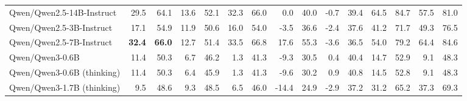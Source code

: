 \documentclass{article}
\begin{document}
\begin{table}[htbp]
\begin{threeparttable}
\begin{adjustbox}{max width=\textwidth}
\begin{tabular}{lrrrrrrrrrrrrrr}
Qwen/Qwen2.5-14B-Instruct & \cellcolor[HTML]{A9D1E5}29.5 & \cellcolor[HTML]{A6CFE4}64.1 & \cellcolor[HTML]{C5E0ED}13.6 & \cellcolor[HTML]{C3DFEC}52.1 & \cellcolor[HTML]{A7D0E4}32.3 & \cellcolor[HTML]{A3CEE3}66.0 & \cellcolor[HTML]{FADCCF}0.0 & \cellcolor[HTML]{FCE7DE}40.0 & \cellcolor[HTML]{E6F2F7}-0.7 & \cellcolor[HTML]{E4F0F6}39.4 & \cellcolor[HTML]{DAEBF3}64.5 & \cellcolor[HTML]{CAE2EF}84.7 & \cellcolor[HTML]{D3E7F1}57.5 & \cellcolor[HTML]{C5E0ED}81.0 \\
Qwen/Qwen2.5-3B-Instruct & \cellcolor[HTML]{FDF2ED}17.1 & \cellcolor[HTML]{FEF8F6}54.9 & \cellcolor[HTML]{EDF5F9}11.9 & \cellcolor[HTML]{EBF4F8}50.6 & \cellcolor[HTML]{FDF1EC}16.0 & \cellcolor[HTML]{FEFAF8}54.0 & \cellcolor[HTML]{F9CFBC}-3.5 & \cellcolor[HTML]{FAD8C9}36.6 & \cellcolor[HTML]{FCEBE3}-2.4 & \cellcolor[HTML]{FCEDE6}37.6 & \cellcolor[HTML]{FBE5DC}41.2 & \cellcolor[HTML]{FDF5F1}71.7 & \cellcolor[HTML]{EDF5F9}49.3 & \cellcolor[HTML]{DCECF4}76.5 \\
Qwen/Qwen2.5-7B-Instruct & \cellcolor[HTML]{92C5DE}\textbf{32.4} & \cellcolor[HTML]{92C5DE}\textbf{66.0} & \cellcolor[HTML]{D9EBF3}12.7 & \cellcolor[HTML]{D6E9F2}51.4 & \cellcolor[HTML]{9FCCE2}33.5 & \cellcolor[HTML]{9DCBE1}66.8 & \cellcolor[HTML]{D6E9F2}17.6 & \cellcolor[HTML]{CAE3EF}55.3 & \cellcolor[HTML]{F9D1C0}-3.6 & \cellcolor[HTML]{F9D3C2}36.5 & \cellcolor[HTML]{F8FBFD}54.0 & \cellcolor[HTML]{E5F1F7}79.2 & \cellcolor[HTML]{BDDCEB}64.4 & \cellcolor[HTML]{B3D6E8}84.6 \\
Qwen/Qwen3-0.6B & \cellcolor[HTML]{F8CBB7}11.4 & \cellcolor[HTML]{F9D0BD}50.3 & \cellcolor[HTML]{F4AA89}6.7 & \cellcolor[HTML]{F4AA8A}46.2 & \cellcolor[HTML]{F4A582}1.3 & \cellcolor[HTML]{F4A582}41.3 & \cellcolor[HTML]{F6B89D}-9.3 & \cellcolor[HTML]{F7BDA4}30.5 & \cellcolor[HTML]{C8E2EE}0.4 & \cellcolor[HTML]{C6E0ED}40.4 & \cellcolor[HTML]{F4A684}14.7 & \cellcolor[HTML]{F4A785}52.9 & \cellcolor[HTML]{F4A582}9.1 & \cellcolor[HTML]{F4A582}48.3 \\
Qwen/Qwen3-0.6B (thinking) & \cellcolor[HTML]{F8CBB7}11.4 & \cellcolor[HTML]{F9D0BD}50.3 & \cellcolor[HTML]{F4A582}6.4 & \cellcolor[HTML]{F4A582}45.9 & \cellcolor[HTML]{F4A582}1.3 & \cellcolor[HTML]{F4A582}41.3 & \cellcolor[HTML]{F6B79B}-9.6 & \cellcolor[HTML]{F6BCA2}30.2 & \cellcolor[HTML]{BCDBEA}0.9 & \cellcolor[HTML]{BADAEA}40.8 & \cellcolor[HTML]{F4A684}14.5 & \cellcolor[HTML]{F4A785}52.8 & \cellcolor[HTML]{F4A582}9.1 & \cellcolor[HTML]{F4A582}48.3 \\
Qwen/Qwen3-1.7B (thinking) & \cellcolor[HTML]{F7BEA5}9.5 & \cellcolor[HTML]{F7C2AA}48.6 & \cellcolor[HTML]{FADDD0}9.3 & \cellcolor[HTML]{FBDFD3}48.5 & \cellcolor[HTML]{F7C0A7}6.5 & \cellcolor[HTML]{F7C4AD}46.0 & \cellcolor[HTML]{F4A582}-14.4 & \cellcolor[HTML]{F4A582}24.9 & \cellcolor[HTML]{FBE1D5}-2.9 & \cellcolor[HTML]{FBE2D8}37.2 & \cellcolor[HTML]{F9CEBB}31.2 & \cellcolor[HTML]{FADACC}65.2 & \cellcolor[HTML]{FCEEE8}37.3 & \cellcolor[HTML]{FEFDFC}69.3 \\

\end{tabular}
\end{adjustbox}
\end{threeparttable}
\end{table}
\end{document}

